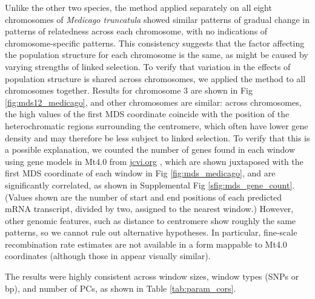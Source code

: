 \documentclass[11pt, oneside]{article}   	%
\newcommand\citet{\cite}
\newcommand\citep{\cite}
\newcommand{\Figure}{Fig }
\newcommand{\Figure}{{Figure }}
\renewcommand{\revpoint}[2]{\relax}
\begin{document}
Unlike the other two species,
the method applied separately on all eight chromosomes of \textit{Medicago truncatula} 
showed similar patterns of gradual change in patterns of relatedness across each chromosome,
with no indications of chromosome-specific patterns.
This consistency suggests that the factor affecting the population structure for each chromosome is the same,
as might be caused by varying strengths of linked selection.
To verify that variation in the effects of population structure is shared across chromosomes,
we applied the method to all chromosomes together.
Results for chromosome 3 are shown in \Figure \ref{fig:mds12_medicago}, \revpoint{2}{13}
and other chromosomes are similar:
across chromosomes, the high values of the first MDS coordinate coincide with the position of the heterochromatic regions surrounding the centromere,
which often have lower gene density and may therefore be less subject to linked selection.
To verify that this is a possible explanation,
we counted the number of genes found in each window using gene models in Mt4.0 from \url{jcvi.org} \citep{tang2014improved},
which are shown juxtaposed with
the first MDS coordinate of each window in \Figure \ref{fig:mds_medicago},
and are significantly correlated, as shown in Supplemental \Figure \ref{sfig:mds_gene_count}.
(Values shown are the number of start and end positions of each predicted mRNA transcript,
divided by two, assigned to the nearest window.)
However, other genomic features, such as distance to centromere show roughly the same patterns,
so we cannot rule out alternative hypotheses.
In particular, fine-scale recombination rate estimates are not available in a form mappable
to Mt4.0 coordinates (although those in \citet{paape2012finescale} appear visually similar).
\revpoint{2}{8}

The results were highly consistent across window sizes, window types (SNPs or bp),
and number of PCs, as shown in Table \ref{tab:param_cors}.
\revpoint{1}{4} \revpoint{1}{5}
\end{document}

